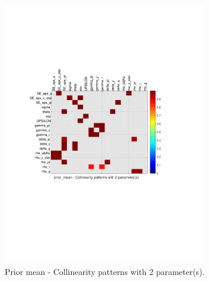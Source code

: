 
\begin{figure}[H]
\centering 
\includegraphics[width=0.8\textwidth]{nash/identification/nash_ident_collinearity_prior_mean_2}
\caption{Prior mean  - Collinearity patterns with 2 parameter(s).}\label{Fig:collinearity:prior_mean:2_pars}
\end{figure}

